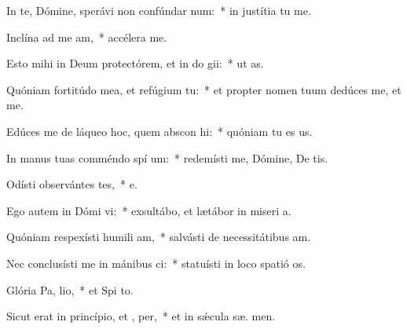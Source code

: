 \item In te, Dómine, sperávi non confúndar  num:~* in justítia tu  me.
\item Inclína ad me  am,~* accélera   me.
\item Esto mihi in Deum protectórem, et in do gii:~* ut   as.
\item Quóniam fortitúdo mea, et refúgium   tu:~* et propter nomen tuum dedúces me, et  me.
\item Edúces me de láqueo hoc, quem abscon hi:~* quóniam tu es  us.
\item In manus tuas comméndo spí um:~* redemísti me, Dómine, De tis.
\item Odísti observántes tes,~* e.
\item Ego autem in Dómi vi:~* exsultábo, et lætábor in miseri a.
\item Quóniam respexísti humili am,~* salvásti de necessitátibus  am.
\item Nec conclusísti me in mánibus ci:~* statuísti in loco spatió  os.
\item Glória Pa,  lio,~* et Spi to.
\item Sicut erat in princípio, et ,  per,~* et in sǽcula sæ. men.
